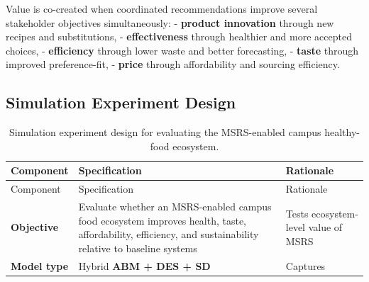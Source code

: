 \documentclass[
  letterpaper,
  DIV=11,
  numbers=noendperiod]{scrartcl}
\begin{document}
Value is co-created when coordinated recommendations improve several
stakeholder objectives simultaneously: - \textbf{product innovation}
through new recipes and substitutions, - \textbf{effectiveness} through
healthier and more accepted choices, - \textbf{efficiency} through lower
waste and better forecasting, - \textbf{taste} through improved
preference-fit, - \textbf{price} through affordability and sourcing
efficiency.

\subsection{Simulation Experiment
Design}\label{simulation-experiment-design}

\begin{longtable}[]{@{}
  >{\raggedright\arraybackslash}p{}
  >{\raggedright\arraybackslash}p{}
  >{\raggedright\arraybackslash}p{}@{}}
\caption{Simulation experiment design for evaluating the MSRS-enabled
campus healthy-food ecosystem.}\tabularnewline
\toprule\noalign{}
\begin{minipage}[b]{\linewidth}\raggedright
Component
\end{minipage} & \begin{minipage}[b]{\linewidth}\raggedright
Specification
\end{minipage} & \begin{minipage}[b]{\linewidth}\raggedright
Rationale
\end{minipage} \\
\midrule\noalign{}
\endfirsthead
\toprule\noalign{}
\begin{minipage}[b]{\linewidth}\raggedright
Component
\end{minipage} & \begin{minipage}[b]{\linewidth}\raggedright
Specification
\end{minipage} & \begin{minipage}[b]{\linewidth}\raggedright
Rationale
\end{minipage} \\
\midrule\noalign{}
\endhead
\bottomrule\noalign{}
\endlastfoot
\textbf{Objective} & Evaluate whether an MSRS-enabled campus food
ecosystem improves health, taste, affordability, efficiency, and
sustainability relative to baseline systems & Tests ecosystem-level
value of MSRS \\
\textbf{Model type} & Hybrid \textbf{ABM + DES + SD} & Captures

\end{longtable}
\end{document}
